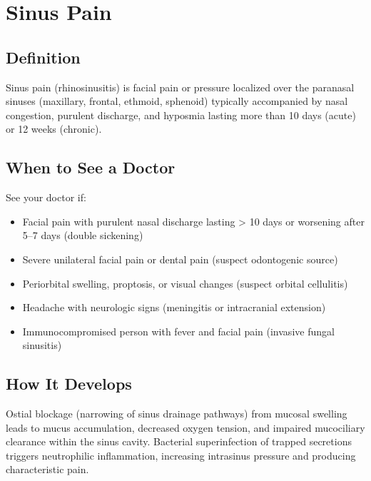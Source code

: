 \chapter{Sinus Pain}

\section*{Definition}
Sinus pain (rhinosinusitis) is facial pain or pressure localized over the paranasal sinuses (maxillary, frontal, ethmoid, sphenoid) typically accompanied by nasal congestion, purulent discharge, and hyposmia lasting more than 10 days (acute) or 12 weeks (chronic).

\section*{When to See a Doctor}
See your doctor if:
\begin{itemize}
  \item Facial pain with purulent nasal discharge lasting > 10 days or worsening after 5--7 days (double sickening)
  \item Severe unilateral facial pain or dental pain (suspect odontogenic source)
  \item Periorbital swelling, proptosis, or visual changes (suspect orbital cellulitis)
  \item Headache with neurologic signs (meningitis or intracranial extension)
  \item Immunocompromised person with fever and facial pain (invasive fungal sinusitis)
\end{itemize}

\section*{How It Develops}
Ostial blockage (narrowing of sinus drainage pathways) from mucosal swelling leads to mucus accumulation, decreased oxygen tension, and impaired mucociliary clearance within the sinus cavity. Bacterial superinfection of trapped secretions triggers neutrophilic inflammation, increasing intrasinus pressure and producing characteristic pain.

